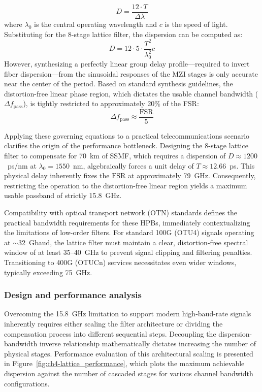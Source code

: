 \begin{equation}
    D = \frac{12·T}{\Delta\lambda}
\end{equation}
where $\lambda_0$ is the central operating wavelength and $c$ is the speed of light. 
Substituting for the 8-stage lattice filter, the dispersion can be computed as:
\begin{equation}
    D = 12·5·\frac{T^2}{\lambda_0^2} c
\end{equation}
However, synthesizing a perfectly linear group delay profile—required to invert fiber
dispersion—from the sinusoidal responses of the MZI stages is only accurate near the center of the 
period. Based on standard synthesis guidelines, the distortion-free linear phase region, which 
dictates the usable channel bandwidth ($\Delta f_{\text{pass}}$), is tightly restricted to 
approximately 20\% of the FSR:
\begin{equation}
    \Delta f_{\text{pass}} \approx \frac{\text{FSR}}{5}
\end{equation}

Applying these governing equations to a practical telecommunications scenario clarifies the origin 
of the performance bottleneck. Designing the 8-stage lattice filter to compensate for 70~km of 
SSMF, which requires a dispersion of $D \approx 1200$~ps/nm at $\lambda_0 = 1550$~nm, algebraically 
forces a unit delay of $T \approx 12.66$~ps. This physical delay inherently fixes the $\text{FSR}$ 
at approximately 79~GHz. Consequently, restricting the operation to the distortion-free linear 
region yields a maximum usable passband of strictly 15.8~GHz.

Compatibility with optical transport network (OTN) standards defines the practical bandwidth 
requirements for these HPBs, immediately contextualizing the limitations of low-order filters. For 
standard 100G (OTU4) signals operating at $\sim$32~Gbaud, the lattice filter must maintain a clear, 
distortion-free spectral window of at least 35--40~GHz to prevent signal clipping and filtering 
penalties. Transitioning to 400G (OTUCn) services necessitates even wider windows, typically 
exceeding 75~GHz. 

\subsubsection{Design and performance analysis}

Overcoming the 15.8~GHz limitation to support modern high-baud-rate signals inherently requires 
either scaling the filter architecture or dividing the compensation process into different 
sequential steps. Decoupling the dispersion-bandwidth inverse relationship mathematically dictates 
increasing the number of physical stages. Performance evaluation of this architectural scaling is 
presented in Figure~\ref{fig:ch4-lattice_performance}, which plots the maximum achievable 
dispersion against the number of cascaded stages for various channel bandwidth configurations. 

